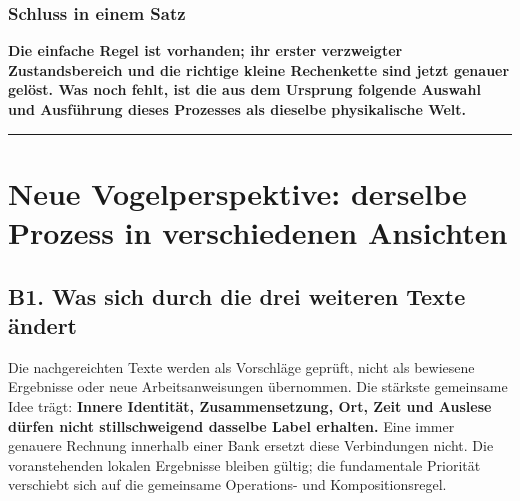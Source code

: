 \subsubsection{Schluss in einem Satz}\label{schluss-in-einem-satz}

\textbf{Die einfache Regel ist vorhanden; ihr erster verzweigter
Zustandsbereich und die richtige kleine Rechenkette sind jetzt genauer
gelöst. Was noch fehlt, ist die aus dem Ursprung folgende Auswahl und
Ausführung dieses Prozesses als dieselbe physikalische Welt.}

\begin{center}\rule{0.5\linewidth}{0.5pt}\end{center}

\section{Neue Vogelperspektive: derselbe Prozess in verschiedenen
Ansichten}\label{neue-vogelperspektive-derselbe-prozess-in-verschiedenen-ansichten}

\subsection{B1. Was sich durch die drei weiteren Texte
ändert}\label{b1.-was-sich-durch-die-drei-weiteren-texte-uxe4ndert}

Die nachgereichten Texte werden als Vorschläge geprüft, nicht als
bewiesene Ergebnisse oder neue Arbeitsanweisungen übernommen. Die
stärkste gemeinsame Idee trägt: \textbf{Innere Identität,
Zusammensetzung, Ort, Zeit und Auslese dürfen nicht stillschweigend
dasselbe Label erhalten.} Eine immer genauere Rechnung innerhalb einer
Bank ersetzt diese Verbindungen nicht. Die voranstehenden lokalen
Ergebnisse bleiben gültig; die fundamentale Priorität verschiebt sich
auf die gemeinsame Operations- und Kompositionsregel.

